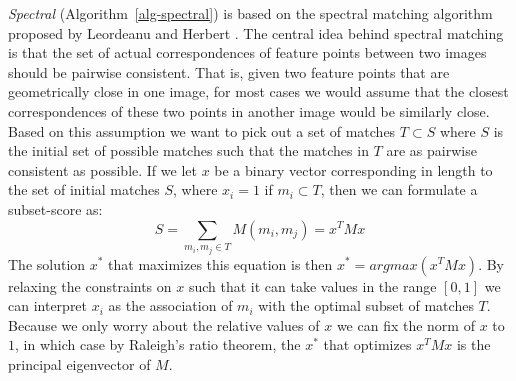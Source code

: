 \emph{Spectral} (Algorithm~\ref{alg-spectral}) is based on the spectral 
matching algorithm proposed by Leordeanu and Herbert 
\cite{leordeanu2005spectral}.  The central idea behind spectral matching 
is that the set of actual correspondences of feature points between two 
images should be pairwise consistent. That is, given two feature points 
that are geometrically close in one image, for most cases we would 
assume that the closest correspondences of these two points in another 
image would be similarly close.  Based on this assumption we want to 
pick out a set of matches $T \subset S$ where $S$ is the initial set of 
possible matches such that the matches in $T$ are as pairwise consistent 
as possible. If we let $x$ be a binary vector corresponding in length to 
the set of initial matches $S$, where $x_i = 1$ if $m_i \subset T$, then 
we can formulate a subset-score as:
\begin{equation*}
	S = \sum_{m_i, m_j \in T} M(m_i, m_j) = x^TMx
\end{equation*}
The solution $x^{*}$ that maximizes this equation is then $x^{*} = 
argmax(x^TMx)$. By relaxing the constraints on $x$ such that it can take
values in the range $\left[0, 1\right]$ we can interpret $x_i$ as the
association of $m_i$ with the optimal subset of matches $T$. Because we 
only worry about the relative values of $x$ we can fix the norm of $x$ 
to $1$, in which case by Raleigh's ratio theorem, the $x^{*}$ that 
optimizes $x^TMx$ is the principal eigenvector of $M$.

